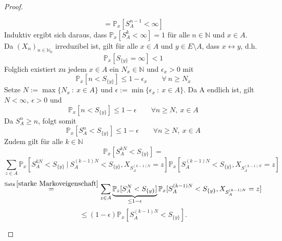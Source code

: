 \documentclass[a4paper,12pt]{scrartcl}
\theoremstyle{definition}
\begin{document}
\begin{proof}
\begin{itemize}
\begin{equation*}
\end{equation*}
\begin{equation*}
= \mathbb{P}_{x}[S_{A}^{n-1} < \infty]
\end{equation*}
Induktiv ergibt sich daraus, dass $\mathbb{P}_{x}[S_{A}^{k} < \infty] = 1$ für alle $n \in \mathbb{N}$ und $x \in A$.
\\
Da $(X_{n})_{n \in \mathbb{N}_{0}}$ irreduzibel ist, gilt für alle $x \in A$ und $y \in E \setminus A$, dass $x \leftrightarrow y$, d.h.
\begin{equation*}
\mathbb{P}_{x}[S_{\lbrace y \rbrace} = \infty] < 1
\end{equation*}
Folglich existiert zu jedem $x \in A$ ein $N_{x} \in \mathbb{N}$ und $\epsilon_{x} > 0$ mit 
\begin{equation*}
\mathbb{P}_{x}[n < S_{\lbrace y \rbrace}] \leq 1 - \epsilon_{x} \qquad \forall \: n \geq N_{x}
\end{equation*}
Setze $N := \max \lbrace N_{x} \: : \: x \in A \rbrace$ und $\epsilon := \min \lbrace \epsilon_{x} \: : \: x \in A \rbrace$. Da A endlich ist, gilt $N < \infty, \: \epsilon > 0 $ und
\begin{equation*}
\mathbb{P}_{x}[n < S_{\lbrace y \rbrace}] \leq 1 - \epsilon \qquad \forall n \geq N, \: x \in A
\end{equation*}
Da $S_{A}^{n} \geq n$, folgt somit
\begin{equation*}
\mathbb{P}_{x}[S_{A}^{n} < S_{\lbrace y \rbrace}] \leq 1 - \epsilon \qquad \forall n \geq N, \: x \in A
\end{equation*}
Zudem gilt für alle $k \in \mathbb{N}$
\begin{equation*}
\mathbb{P}_{x}[S_{A}^{kN} < S_{\lbrace y \rbrace}] = 
\end{equation*}
\begin{equation*}
\sum_{z \in A} \mathbb{P}_{x}[S_{A}^{kN} < S_{\lbrace y \rbrace} \: | \: S_{A}^{(k-1)N} < S_{\lbrace y \rbrace}, X_{S_{A}^{(k-1)N}} = z] \mathbb{P}_{x}[ S_{A}^{(k-1)N} < S_{\lbrace y \rbrace}, X_{S_{A}^{(k-1)N}} = z]
\end{equation*}
\begin{equation*}
\stackrel{\mathrm{Satz} \: \ref{starke Markoveigenschaft}}{=} \sum_{z \in A} \underbrace{\mathbb{P}_{z}[S_{A}^{N} < S_{\lbrace y \rbrace}]}_{\leq 1-\epsilon} \mathbb{P}_{x}[ S_{A}^{(k-1)N} < S_{\lbrace y \rbrace}, X_{S_{A}^{(k-1)N}} = z]
\end{equation*}
\begin{equation*}
\leq (1- \epsilon)\mathbb{P}_{x}[ S_{A}^{(k-1)N} < S_{\lbrace y \rbrace}].

\end{equation*}
\end{itemize}
\end{proof}
\end{document}
